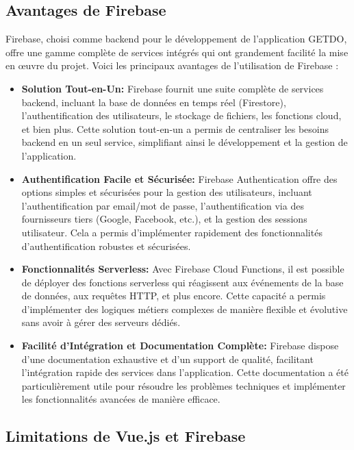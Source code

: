 \documentclass[a4paper,12pt]{report}
\begin{document}
    \subsection{Avantages de Firebase}
    Firebase, choisi comme backend pour le développement de l'application GETDO, offre une gamme complète de services intégrés qui ont grandement facilité la mise en œuvre du projet. Voici les principaux avantages de l'utilisation de Firebase :
    \begin{itemize}
      \item\textbf{Solution Tout-en-Un:}
      Firebase fournit une suite complète de services backend, incluant la base de données en temps réel (Firestore), l'authentification des utilisateurs, le stockage de fichiers, les fonctions cloud, et bien plus. Cette solution tout-en-un a permis de centraliser les besoins backend en un seul service, simplifiant ainsi le développement et la gestion de l'application.
      
      \item\textbf{Authentification Facile et Sécurisée:}
      Firebase Authentication offre des options simples et sécurisées pour la gestion des utilisateurs, incluant l'authentification par email/mot de passe, l'authentification via des fournisseurs tiers (Google, Facebook, etc.), et la gestion des sessions utilisateur. Cela a permis d'implémenter rapidement des fonctionnalités d'authentification robustes et sécurisées.

      \item\textbf{Fonctionnalités Serverless:}
      Avec Firebase Cloud Functions, il est possible de déployer des fonctions serverless qui réagissent aux événements de la base de données, aux requêtes HTTP, et plus encore. Cette capacité a permis d'implémenter des logiques métiers complexes de manière flexible et évolutive sans avoir à gérer des serveurs dédiés.
      
      \item\textbf{Facilité d'Intégration et Documentation Complète:}
      Firebase dispose d'une documentation exhaustive et d'un support de qualité, facilitant l'intégration rapide des services dans l'application. Cette documentation a été particulièrement utile pour résoudre les problèmes techniques et implémenter les fonctionnalités avancées de manière efficace.
      
    \end{itemize}
    
    \subsection{Limitations de Vue.js et Firebase}
\end{document}
